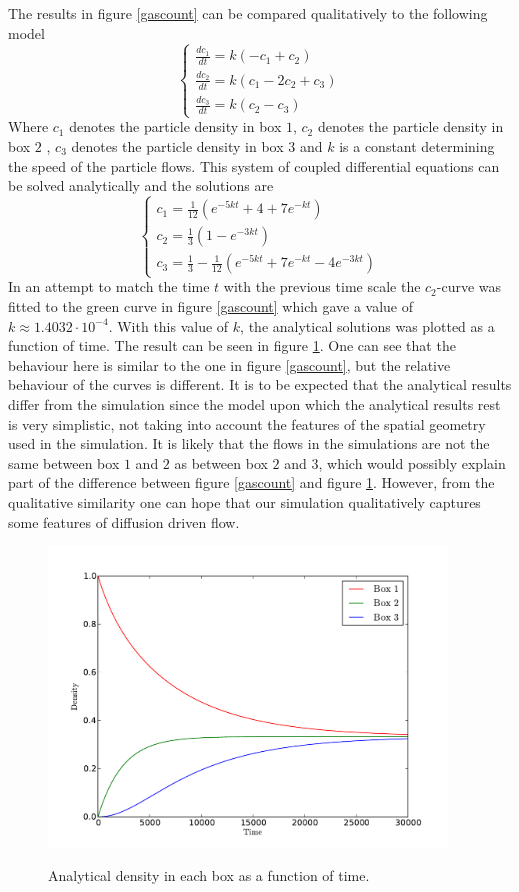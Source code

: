 \documentclass[12pt,a4paper]{article}
\begin{document}
The results in figure \ref{gascount} can be compared qualitatively to the following model
\[
\left\{
\begin{array}{l}
  \frac{dc_1}{dt}=k(-c_1+c_2)\\
  \frac{dc_2}{dt}=k(c_1-2c_2+c_3)\\
  \frac{dc_3}{dt}=k(c_2-c_3)
\end{array}\right.
\]
Where $c_1$ denotes the particle density in box $1$, $c_2$ denotes the particle density in box $2$
, $c_3$ denotes the particle density in box $3$ and $k$ is a constant determining the speed of
the particle flows. This system of coupled differential equations can be solved analytically and
the solutions are
\[
\left\{
\begin{array}{l}
  c_1=\frac{1}{12}(e^{-5kt}+4+7e^{-kt})\\
  c_2=\frac{1}{3}(1-e^{-3kt})\\
  c_3=\frac{1}{3}-\frac{1}{12}(e^{-5kt}+7e^{-kt}-4e^{-3kt})
\end{array}\right.
\]
In an attempt to match the time $t$ with the previous time scale 
the $c_2$-curve was fitted to the green curve in figure \ref{gascount} which gave a value of
$k\approx 1.4032 \cdot 10^{-4}$. With this value of $k$, the analytical solutions was plotted
as a function of time. The result can be seen in figure \ref{gascount_anal}. One can see that
the behaviour here is similar to the one in figure \ref{gascount}, but the relative behaviour
of the curves is different. It is to be expected that the analytical results differ from the
simulation since the model upon which the analytical results rest is very simplistic, not 
taking into account the features of the spatial geometry used in the simulation. It is
likely that the flows in the simulations are not the same between box $1$ and $2$ as between
box $2$ and $3$, which would possibly explain part of the difference between figure \ref{gascount}
and figure \ref{gascount_anal}. 
However, from the qualitative similarity one can hope that our simulation qualitatively
captures some features of diffusion driven flow.

\begin{figure}[htp]
\centering
  \includegraphics[width=300pt]{figs/gascount_anal.pdf}
\label{gascount_anal}
\caption{Analytical density in each box as a function of time.}
\end{figure}
\end{document}
